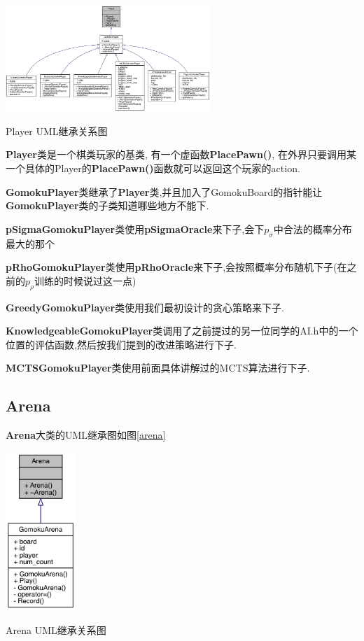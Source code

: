 \documentclass[twocolumn]{article}
\begin{document}
\begin{center}
\makeatletter
\def\@captype{figure}
\makeatother
\includegraphics [height=4cm]{player}
\caption{Player UML继承关系图}
\label{player}
\end{center}

\noindent\textbf{Player}类是一个棋类玩家的基类, 有一个虚函数\textbf{PlacePawn()}, 在外界只要调用某一个具体的Player的\textbf{PlacePawn()}函数就可以返回这个玩家的action.

\noindent\textbf{GomokuPlayer}类继承了\textbf{Player}类,并且加入了GomokuBoard的指针能让\textbf{GomokuPlayer}类的子类知道哪些地方不能下.

\noindent\textbf{pSigmaGomokuPlayer}类使用\textbf{pSigmaOracle}来下子,会下$p_\sigma$中合法的概率分布最大的那个

\noindent\textbf{pRhoGomokuPlayer}类使用\textbf{pRhoOracle}来下子,会按照概率分布随机下子(在之前的$p_\rho$训练的时候说过这一点)

\noindent\textbf{GreedyGomokuPlayer}类使用我们最初设计的贪心策略来下子.

\noindent\textbf{KnowledgeableGomokuPlayer}类调用了之前提过的另一位同学的AI.h中的一个位置的评估函数,然后按我们提到的改进策略进行下子.

\noindent\textbf{MCTSGomokuPlayer}类使用前面具体讲解过的MCTS算法进行下子.

\subsection{Arena}

\textbf{Arena}大类的UML继承图如图\ref{arena}

\begin{center}
\makeatletter
\def\@captype{figure}
\makeatother
\includegraphics [height=6cm]{arena}
\caption{Arena UML继承关系图}
\label{arena}
\end{center}
\end{document}
